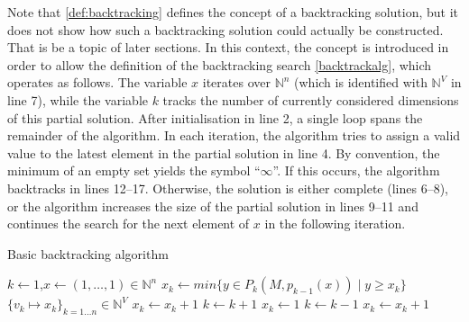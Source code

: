     Note that \autoref{def:backtracking} defines the concept of a backtracking
    solution, but it does not show how such a backtracking solution could
    actually be constructed.
    That is be a topic of later sections.
    In this context, the concept is introduced in order to allow the definition
    of the backtracking search \autoref{backtrackalg}, which operates as
    follows.
    The variable $x$ iterates over $\mathbb N^n$
    (which is identified with $\mathbb N^V$ in line 7), while the variable $k$
    tracks the number of currently considered dimensions of this partial
    solution.
    After initialisation in line 2, a single loop spans the remainder of the
    algorithm.
    In each iteration, the algorithm tries to assign a valid value to the latest
    element in the partial solution in line 4.
    By convention, the minimum of an empty set yields the symbol ``$\infty$''.
    If this occurs, the algorithm backtracks in lines 12--17.
    Otherwise, the solution is either complete (lines 6--8), or the algorithm
    increases the size of the partial solution in lines 9--11 and continues the
    search for the next element of $x$ in the following iteration.

\begin{algorithm}[p]
    \caption{Basic backtracking algorithm}
    \begin{algorithmic}[1]
        \vspace{-0.45em}
            \State $k\gets1$,\quad$x\gets(1,\dots,1)\in\mathbb N^n$\vspace{-0.45em}
            \vspace{-0.45em}
                \State $x_k\gets min\{y\in P_k(M,p_{k-1}(x))\mid y\geq x_k\}$\vspace{-0.45em}
                \vspace{-0.45em}
                    \vspace{-0.45em}
                         $\{v_k\mapsto x_k\}_{k=1\dots n}\in\mathbb N^V$\vspace{-0.45em}
                        \State $x_k\gets x_k+1$\vspace{-0.45em}
                    \Else\vspace{-0.45em}
                        \State $k\gets k+1$\vspace{-0.45em}
                        \State $x_k\gets1$\vspace{-0.45em}
                    \EndIf
                \Else\vspace{-0.45em}
                    \State $k\gets k-1$\vspace{-0.45em}
                    \vspace{-0.45em}
                        \State$x_k\gets x_k+1$\vspace{-0.45em}
                    \Else\vspace{-0.45em}
                    \EndIf
                \EndIf
            \EndWhile
        \EndProcedure
    \end{algorithmic}
    \label{backtrackalg}
\end{algorithm}


